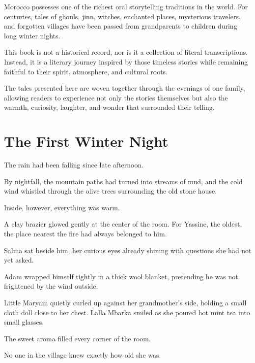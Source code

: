 \documentclass[12pt,openany]{book}
\begin{document}
Morocco possesses one of the richest oral storytelling traditions in the world. For centuries, tales of ghouls, jinn, witches, enchanted places, mysterious travelers, and forgotten villages have been passed from grandparents to children during long winter nights.

This book is not a historical record, nor is it a collection of literal transcriptions. Instead, it is a literary journey inspired by those timeless stories while remaining faithful to their spirit, atmosphere, and cultural roots.

The tales presented here are woven together through the evenings of one family, allowing readers to experience not only the stories themselves but also the warmth, curiosity, laughter, and wonder that surrounded their telling.
\clearpage


\tableofcontents

\mainmatter
\pagestyle{fancy}


\chapter{The First Winter Night}

The rain had been falling since late afternoon.

By nightfall, the mountain paths had turned into streams of mud, and the cold wind whistled through the olive trees surrounding the old stone house.

Inside, however, everything was warm.

A clay brazier glowed gently at the center of the room.
For Yassine, the oldest, the place nearest the fire had always belonged to him.

Salma sat beside him, her curious eyes already shining with questions she had not yet asked.

Adam wrapped himself tightly in a thick wool blanket, pretending he was not frightened by the wind outside.

Little Maryam quietly curled up against her grandmother's side, holding a small cloth doll close to her chest.
Lalla Mbarka smiled as she poured hot mint tea into small glasses.

The sweet aroma filled every corner of the room.

No one in the village knew exactly how old she was.
\end{document}
